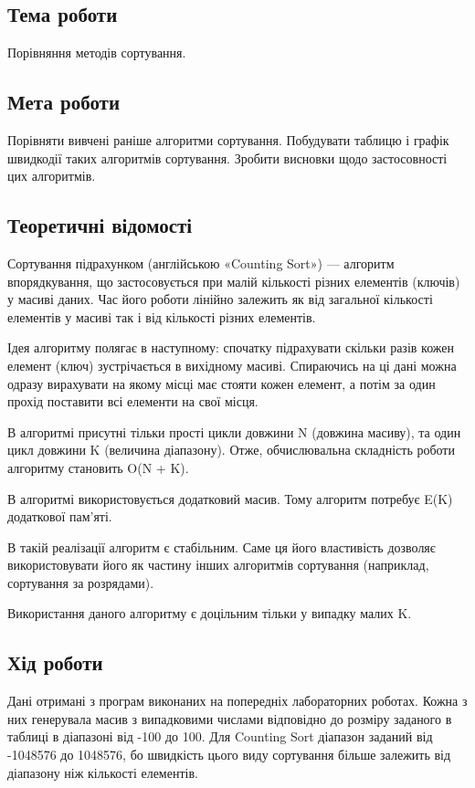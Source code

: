\documentclass[12pt]{extarticle}
\begin{document}
\subsection*{Тема роботи} 
Порівняння методів сортування.

\subsection*{Мета роботи} Порівняти вивчені раніше алгоритми сортування. Побудувати таблицю і графік швидкодії таких алгоритмів сортування. Зробити висновки щодо застосовності цих алгоритмів.




\subsection*{Теоретичні відомості}
Сортування підрахунком (англійською «Counting Sort») — алгоритм впорядкування, що застосовується при малій кількості різних елементів (ключів) у масиві даних. Час його роботи лінійно залежить як від загальної кількості елементів у масиві так і від кількості різних елементів.

Ідея алгоритму полягає в наступному: спочатку підрахувати скільки разів кожен елемент (ключ) зустрічається в вихідному масиві. Спираючись на ці дані можна одразу вирахувати на якому місці має стояти кожен елемент, а потім за один прохід поставити всі елементи на свої місця.

В алгоритмі присутні тільки прості цикли довжини N (довжина масиву), та один цикл довжини K (величина діапазону). Отже, обчислювальна складність роботи алгоритму становить O(N + K).

В алгоритмі використовується додатковий масив. Тому алгоритм потребує E(K) додаткової пам’яті.

В такій реалізації алгоритм є стабільним. Саме ця його властивість дозволяє використовувати його як частину інших алгоритмів сортування (наприклад, сортування за розрядами).

Використання даного алгоритму є доцільним тільки у випадку малих K.

\subsection*{{Хід роботи}}

Дані отримані з програм виконаних на попередніх лабораторних роботах. 
Кожна з них генерувала масив з випадковими числами відповідно до 
розміру заданого в таблиці в діапазоні від -100 до 100. Для Counting Sort
діапазон заданий від -1048576 до 1048576, бо швидкість цього виду сортування більше залежить
від діапазону ніж кількості елементів.
\end{document}
